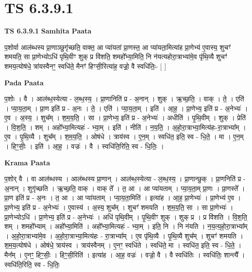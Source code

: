 \documentclass[17pt]{extarticle}
\begin{document}
\section{ TS 6.3.9.1 }

\textbf{TS 6.3.9.1 } \newline
\textbf{Samhita Paata} \newline

प॒शोर्वा आल॑ब्धस्य प्रा॒णाञ्छुगृ॑च्छति॒ वाक्त॒ आ प्या॑यतां प्रा॒णस्त॒ आ प्या॑यता॒मित्या॑ह प्रा॒णेभ्य॑ ए॒वास्य॒ शुचꣳ॑ शमयति॒ सा प्रा॒णेभ्योऽधि॑ पृथि॒वीꣳ शुक् प्र वि॑शति॒ शमहो᳚भ्या॒मिति॒ नि न॑यत्यहोरा॒त्राभ्या॑मे॒व पृ॑थि॒व्यै शुचꣳ॑ शमय॒त्योष॑धे॒ त्रा॑यस्वैनꣳ॒॒ स्वधि॑ते॒ मैनꣳ॑ हिꣳसी॒रित्या॑ह॒ वज्रो॒॒ वै स्वधि॑तिः॒- [  ] \newline

\textbf{Pada Paata} \newline

प॒शोः । वै । आल॑ब्ध॒स्येत्या - ल॒ब्ध॒स्य॒ । प्रा॒णानिति॑ प्र - अ॒नान् । शुक् । ऋ॒च्छ॒ति॒ । वाक् । ते॒ । एति॑ । प्या॒य॒ता॒म् । प्रा॒ण इति॑ प्र - अ॒नः । ते॒ । एति॑ । प्या॒य॒ता॒म् । इति॑ । आ॒ह॒ । प्रा॒णेभ्य॒ इति॑ प्र - अ॒नेभ्यः॑ । ए॒व । अ॒स्य॒ । शुच᳚म् । श॒म॒य॒ति॒ । सा । प्रा॒णेभ्य॒ इति॑ प्र - अ॒नेभ्यः॑ । अधीति॑ । पृ॒थि॒वीम् । शुक् । प्रेति॑ । वि॒श॒ति॒ । शम् । अहो᳚भ्या॒मित्यहः॑ - भ्या॒म् । इति॑ । नीति॑ । न॒य॒ति॒ । अ॒हो॒रा॒त्राभ्या॒मित्य॑हः-रा॒त्राभ्या᳚म् । ए॒व । पृ॒थि॒व्यै । शुच᳚म् । श॒म॒य॒ति॒ । ओष॑धे । त्राय॑स्व । ए॒न॒म् । स्वधि॑त॒ इति॒ स्व - धि॒ते॒ । मा । ए॒न॒म् । हिꣳ॒॒सीः॒ । इति॑ । आ॒ह॒ । वज्रः॑ । वै । स्वधि॑ति॒रिति॒ स्व - धि॒तिः॒ ।  \newline


\textbf{Krama Paata} \newline

प॒शोर् वै । वा आल॑ब्धस्य । आल॑ब्धस्य प्रा॒णान् । आल॑ब्ध॒स्येत्या - ल॒ब्ध॒स्य॒ । प्रा॒णान्छुक् । प्रा॒णनिति॑ प्र - अ॒नान् । शुगृ॑च्छति । ऋ॒च्छ॒ति॒ वाक् । वाक् ते᳚ । त॒ आ । आ प्या॑यताम् । प्या॒य॒ता॒म् प्रा॒णः । प्रा॒णस्ते᳚ । प्रा॒ण इति॑ प्र - अ॒नः । त॒ आ । आ प्या॑यताम् । प्या॒य॒ता॒मिति॑ । इत्या॑ह । आ॒ह॒ प्रा॒णेभ्यः॑ । प्रा॒णेभ्य॑ ए॒व । प्रा॒णेभ्य॒ इति॑ प्र - अ॒नेभ्यः॑ । ए॒वास्य॑ । अ॒स्य॒ शुच᳚म् । शुचꣳ॑ शमयति । श॒म॒य॒ति॒ सा । सा प्रा॒णेभ्यः॑ । प्रा॒णेभ्योऽधि॑ । प्रा॒णेभ्य॒ इति॑ प्र - अ॒नेभ्यः॑ । अधि॑ पृथि॒वीम् । पृ॒थि॒वीꣳ शुक् । शुक् प्र । प्र वि॑शति । वि॒श॒ति॒ शम् । शमहो᳚भ्याम् । अहो᳚भ्या॒मिति॑ । अहो᳚भ्या॒मित्यहः॑ - भ्या॒म् । इति॒ नि । नि न॑यति । न॒य॒त्य॒हो॒रा॒त्राभ्या᳚म् । अ॒हो॒रा॒त्राभ्या॑मे॒व । अ॒हो॒रा॒त्राभ्या॒मित्य॑हः - रा॒त्राभ्या᳚म् । ए॒व पृ॑थि॒व्यै । पृ॒थि॒व्यै शुच᳚म् । शुचꣳ॑ शमयति । श॒म॒य॒त्योष॑धे । ओष॑धे॒ त्राय॑स्व । त्राय॑स्वैनम् । ए॒नꣳ॒ स्वधि॑ते । स्वधि॑ते॒ मा । स्वधि॑त॒ इति॒ स्व - धि॒ते॒ । मैन᳚म् । ए॒नꣳ॒॒ हिꣳ॒॒सीः॒ । हिꣳ॒॒सी॒रिति॑ । इत्या॑ह । आ॒ह॒ वज्रः॑ । वज्रो॒ वै । वै स्वधि॑तिः । स्वधि॑तिः॒ शान्त्यै᳚ । स्वधि॑ति॒रिति॒ स्व - धि॒तिः॒ \newline
\end{document}
